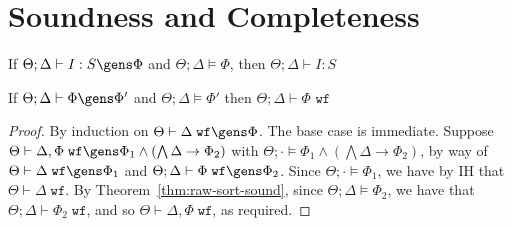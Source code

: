 \begin{mathpar}




\end{mathpar}


\section{Soundness and Completeness}

\begin{theorem}
If $\Theta;\Delta \vdash I : S \gens \Phi$ and $\Theta;\Delta \vDash \Phi$, then $\Theta;\Delta \vdash I : S$ 
\label{thm:raw-sort-sound}
\end{theorem}


\begin{theorem}
If $\Theta ; \Delta \vdash \Phi \gens \Phi'$ and $\Theta ; \Delta \vDash \Phi'$ then $\Theta ; \Delta \vdash \Phi \texttt{ wf}$
\label{thm:raw-constr-sound}
\end{theorem}


\idxctxwfsound*
\begin{proof}
By induction on $\Theta \vdash \Delta \; \texttt{wf} \gens \Phi$. The base case is immediate. Suppose $\Theta \vdash \Delta, \Phi \; \texttt{wf} \gens \Phi_1 \wedge (\bigwedge \Delta \to \Phi_2)$ with $\Theta ; \cdot \vDash \Phi_1 \wedge (\bigwedge \Delta \to \Phi_2)$, by way of
$\Theta \vdash \Delta \; \texttt{wf} \gens \Phi_1$ and $\Theta ; \Delta \vdash \Phi \; \texttt{wf} \gens \Phi_2$.
Since $\Theta ; \cdot \vDash \Phi_1$, we have by IH that $\Theta \vdash \Delta \; \texttt{wf}$. By Theorem~\ref{thm:raw-sort-sound}, since $\Theta ; \Delta \vDash \Phi_2$, we have that $\Theta ; \Delta \vdash \Phi_2 \; \texttt{wf}$, and so $\Theta \vdash \Delta, \Phi \; \texttt{wf}$, as required.
\end{proof}

